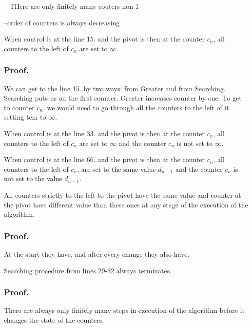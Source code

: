 -- THere are only finitely many couters non 1

--order of counters is always decreasing

\begin{lemma}\label{Greater infinities to the left lemma}
When control is at the line 15. and the pivot is then at the counter $c_n$, all counters 
to the left of $c_n$ are set to $\infty$. 
\end{lemma}
\subsubsection{Proof.}
We can get to the line 15. by two ways: from Greater and from Searching. 
Searching puts us on the first counter. 
Greater increases counter by one. 
To get to counter $c_n$. we would need to go through all the counters to the left of it 
setting tem to $\infty$. 
\begin{lemma}\label{Searching infinities to the left lemma}
When control is at the line 33. and the pivot is then at the counter $c_n$, all counters 
to the left of $c_n$ are set to $\infty$ and the counter $c_n$ is not set to $\infty$. 
\end{lemma}

\begin{lemma}\label{Less same to the left lemma}
When control is at the line 66. and the pivot is then at the counter $c_n$, all counters 
to the left of $c_n$, are set to the same value $d_{n-1}$ and the counter $c_n$ 
is not set to the value $d_{n-1}$. 
\end{lemma}

\begin{lemma}
All counters strictly to the left to the pivot have the same value and 
counter at the pivot have different value than these ones 
 at any stage of 
the execution of the algorithm.
\end{lemma}
\subsubsection{Proof.}
At the start they have, and after every change they also have.
\begin{lemma}\label{Small searching always terminates}
Searching procedure from lines 29-32 always terminates.
\end{lemma}
\subsubsection{Proof.}
\begin{lemma}
There are always only finitely many steps in execution of the algorithm before it 
changes the state of the counters. 
\end{lemma}
